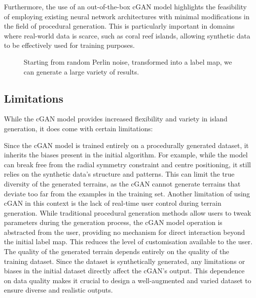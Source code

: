 Furthermore, the use of an out-of-the-box cGAN model highlights the feasibility of employing existing neural network architectures with minimal modifications in the field of procedural generation. This is particularly important in domains where real-world data is scarce, such as coral reef islands, allowing synthetic data to be effectively used for training purposes.

\begin{figure}
\caption{Starting from random Perlin noise, transformed into a label map, we can generate a large variety of results.}
\label{fig:coral-island-perlin-examples}
\end{figure}

\subsection{Limitations}
\label{sec:coral-island-limitations}

While the cGAN model provides increased flexibility and variety in island generation, it does come with certain limitations:

\begin{Itemize}
 Since the cGAN model is trained entirely on a procedurally generated dataset, it inherits the biases present in the initial algorithm. For example, while the model can break free from the radial symmetry constraint and centre positioning, it still relies on the synthetic data's structure and patterns. This can limit the true diversity of the generated terrains, as the cGAN cannot generate terrains that deviate too far from the examples in the training set.
 Another limitation of using cGAN in this context is the lack of real-time user control during terrain generation. While traditional procedural generation methods allow users to tweak parameters during the generation process, the cGAN model operation is abstracted from the user, providing no mechanism for direct interaction beyond the initial label map. This reduces the level of customisation available to the user.
 The quality of the generated terrain depends entirely on the quality of the training dataset. Since the dataset is synthetically generated, any limitations or biases in the initial dataset directly affect the cGAN's output. This dependence on data quality makes it crucial to design a well-augmented and varied dataset to ensure diverse and realistic outputs.
\end{Itemize}

